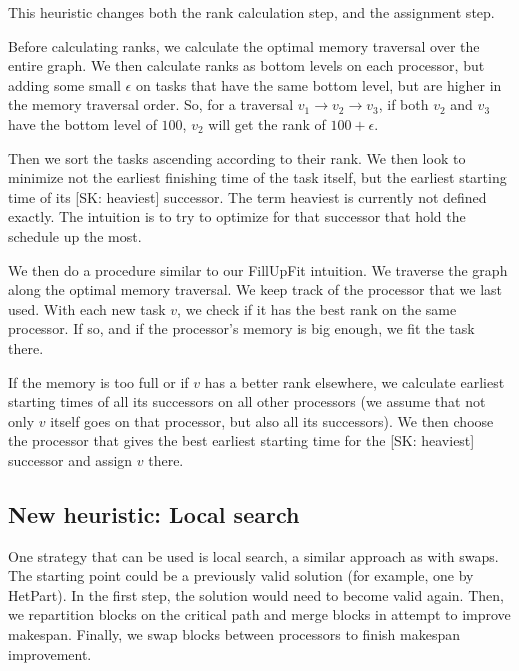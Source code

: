 \documentclass[sigconf,review,anonymous]{acmart}
\newcommand{\skug}[1]{{\color{blue}[SK: #1]}}
\begin{document}
    This heuristic changes both the rank calculation step, and the assignment step.

    Before calculating ranks, we calculate the optimal memory traversal over the entire graph.
    We then calculate ranks as bottom levels on each processor, but adding some small $\epsilon$ on tasks that have the
    same bottom level, but are higher in the memory traversal order.
    So, for a traversal $v_1 \rightarrow v_2 \rightarrow v_3$, if both $v_2$ and $v_3$ have the bottom level of $100$,
    $v_2$ will get the rank of $100+\epsilon$.

    Then we sort the tasks ascending according to their rank.
    We then look to minimize not the earliest finishing time of the task itself, but the earliest starting time of
    its \skug{heaviest} successor.
    The term heaviest is currently not defined exactly.
    The intuition is to try to optimize for that successor that hold the schedule up the most.

    We then do a procedure similar to our FillUpFit intuition.
    We traverse the graph along the optimal memory traversal.
    We keep track of the processor that we last used.
    With each new task $v$, we check if it has the best rank on the same processor.
    If so, and if the processor's memory is big enough, we fit the task there.

    If the memory is too full or if $v$ has a better rank elsewhere, we calculate earliest starting times
    of all its successors on all other processors (we assume that not only $v$ itself goes on that processor, but also
    all its successors).
    We then choose the processor that gives the best earliest starting time for the  \skug{heaviest} successor
    and assign $v$ there.



    \subsection{New heuristic: Local search}
    One strategy that can be used is local search, a similar approach as with swaps.
    The starting point could be a previously valid solution (for example, one by HetPart).
    In the first step, the solution would need to become valid again.
    Then, we repartition blocks on the critical path  and merge blocks in attempt to improve makespan.
    Finally, we swap blocks between processors to finish makespan improvement.
\end{document}
